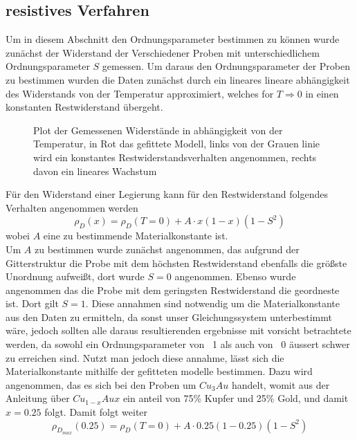 \subsection{resistives Verfahren}
    Um in diesem Abschnitt den Ordnungsparameter bestimmen zu können wurde zunächst der Widerstand der Verschiedener Proben mit
    unterschiedlichem Ordnungsparameter $S$ gemessen. Um daraus den Ordnungsparameter der Proben zu bestimmen
    wurden die Daten zunächst durch ein lineares lineare abhängigkeit des Widerstands von der Temperatur
    approximiert, welches for $T\Rightarrow 0$ in einen konstanten Restwiderstand übergeht.
    \begin{figure}[H]
        \centering
        \caption{Plot der Gemessenen Widerstände in abhängigkeit von der Temperatur, in Rot das gefittete Modell, links von der Grauen linie wird
        ein konstantes Restwiderstandsverhalten angenommen, rechts davon ein lineares Wachstum}
        \label{resistance plot}
    \end{figure}
    Für den Widerstand einer Legierung kann für den Restwiderstand folgendes Verhalten angenommen werden
    \begin{equation}
        \rho_D(x) = \rho_D(T=0) + A\cdot x(1-x)(1-S^2)
    \end{equation}
    wobei $A$ eine zu bestimmende Materialkonstante ist.\\
    Um $A$ zu bestimmen wurde zunächst angenommen, das aufgrund der Gitterstruktur die Probe mit dem höchsten
    Restwiderstand ebenfalls die größste Unordnung aufweißt, dort wurde $S=0$ angenommen. Ebenso wurde angenommen
    das die Probe mit dem geringsten Restwiderstand die geordneste ist. Dort gilt $S=1$. Diese annahmen sind
    notwendig um die Materialkonstante aus den Daten zu ermitteln, da sonst unser Gleichungssystem unterbestimmt wäre,
    jedoch sollten alle daraus resultierenden ergebnisse mit vorsicht betrachtete werden, da sowohl ein Ordnungsparameter
    von ~1 als auch von ~0 äussert schwer zu erreichen sind. Nutzt man jedoch diese annahme, lässt sich die Materialkonstante
    mithilfe der gefitteten modelle bestimmen. Dazu wird angenommen, das es sich bei den Proben um $Cu_3Au$ handelt, womit
    aus der Anleitung über $Cu_{1-x}Aux$ ein anteil von 75\% Kupfer und 25\% Gold, und damit $x=0.25$ folgt. Damit folgt weiter
    \begin{equation}
        \rho_{D_{max}}(0.25) = \rho_D(T=0) + A\cdot 0.25(1-0.25)(1-S^2)
    \end{equation} 

